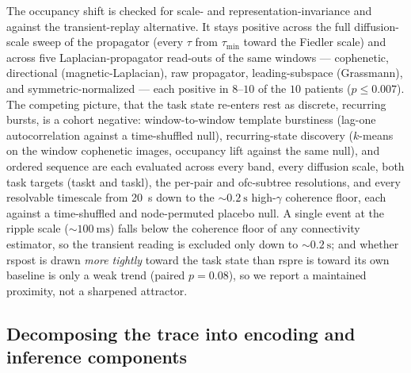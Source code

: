 The occupancy shift is checked for scale- and representation-invariance and against the transient-replay alternative. It stays positive across the full diffusion-scale sweep of the propagator (every \(\tau\) from \(\tau_{\min}\) toward the Fiedler scale) and across five Laplacian-propagator read-outs of the same windows --- cophenetic, directional (magnetic-Laplacian), raw propagator, leading-subspace (Grassmann), and symmetric-normalized --- each positive in \(8\)--\(10\) of the \(10\) patients (\(p \le 0.007\)). The competing picture, that the task state re-enters rest as discrete, recurring bursts, is a cohort negative: window-to-window template burstiness (lag-one autocorrelation against a time-shuffled null), recurring-state discovery (\(k\)-means on the window cophenetic images, occupancy lift against the same null), and ordered sequence are each evaluated across every band, every diffusion scale, both task targets (\acrshort{taskt} and \acrshort{taskl}), the per-pair and \gls{ofc}-subtree resolutions, and every resolvable timescale from \qty{20}{\second} down to the \(\sim\qty{0.2}{\second}\) high-\(\gamma\) coherence floor, each against a time-shuffled and node-permuted placebo null. A single event at the ripple scale (\(\sim\qty{100}{\milli\second}\)) falls below the coherence floor of any connectivity estimator, so the transient reading is excluded only down to \(\sim\qty{0.2}{\second}\); and whether \acrshort{rspost} is drawn \emph{more tightly} toward the task state than \acrshort{rspre} is toward its own baseline is only a weak trend (paired \(p = 0.08\)), so we report a maintained proximity, not a sharpened attractor.

\subsection{Decomposing the trace into encoding and inference components}
\label{ssec:methods_arc}

